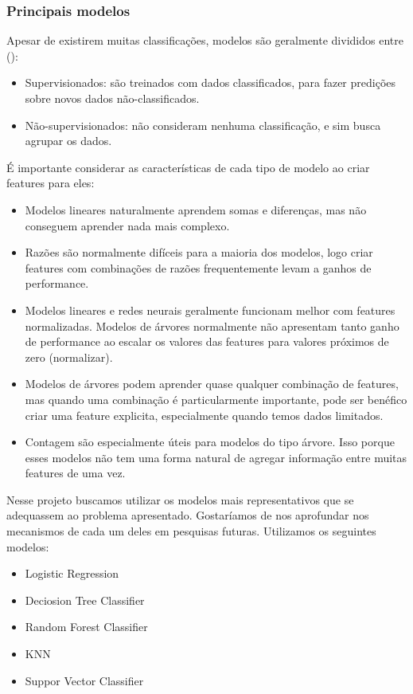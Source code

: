 \documentclass{article}
\begin{document}
\subsubsection{Principais modelos}
Apesar de existirem muitas classificações, modelos são geralmente divididos entre (\cite{SCRATCH,PRINCIPLES}):
\begin{itemize}
\item Supervisionados: são treinados com dados classificados, para fazer predições sobre novos dados não-classificados. 
\item Não-supervisionados: não consideram nenhuma classificação, e sim busca agrupar os dados. 
\end{itemize}

É importante considerar as características de cada tipo de modelo ao criar features para eles:
\begin{itemize}
\item Modelos lineares naturalmente aprendem somas e diferenças, mas não conseguem aprender nada mais complexo.
\item Razões são normalmente difíceis para a maioria dos modelos, logo criar features com combinações de razões frequentemente levam a ganhos de performance.
\item Modelos lineares e redes neurais geralmente funcionam melhor com features normalizadas. Modelos de árvores normalmente não apresentam tanto ganho de performance ao escalar os valores das features para valores próximos de zero (normalizar).
\item Modelos de árvores podem aprender quase qualquer combinação de features, mas quando uma combinação é particularmente importante, pode ser benéfico criar uma feature explicita, especialmente quando temos dados limitados.
\item Contagem são especialmente úteis para modelos do tipo árvore. Isso porque esses modelos não tem uma forma natural de agregar informação entre muitas features de uma vez.
\end{itemize}

Nesse projeto buscamos utilizar os modelos mais representativos que se adequassem ao problema apresentado\cite{vanderplas2016python,aurelien2017hands}. Gostaríamos de nos aprofundar nos mecanismos de cada um deles em pesquisas futuras. Utilizamos os seguintes modelos:
\begin{itemize}
\item Logistic Regression
\item Deciosion Tree Classifier
\item Random Forest Classifier
\item KNN
\item Suppor Vector Classifier
\end{itemize}
\end{document}
